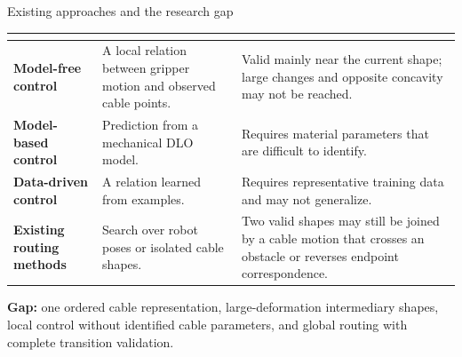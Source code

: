 \documentclass[aspectratio=169,10pt]{beamer}
\begin{document}
\begin{frame}[t]{Existing approaches and the research gap}
  \small
  \renewcommand{\arraystretch}{1.28}
  \setlength{\tabcolsep}{5pt}
  \begin{tabularx}{\textwidth}{>{\bfseries}p{2.35cm}YY}
    \toprule
     &  &
      \\
    \midrule
    Model-free control &
      A local relation between gripper motion and observed cable points. &
      Valid mainly near the current shape; large changes and opposite
      concavity may not be reached.\\
    Model-based control &
      Prediction from a mechanical DLO model. &
      Requires material parameters that are difficult to identify.\\
    Data-driven control &
      A relation learned from examples. &
      Requires representative training data and may not generalize.\\
    Existing routing methods &
      Search over robot poses or isolated cable shapes. &
      Two valid shapes may still be joined by a cable motion that crosses an
      obstacle or reverses endpoint correspondence.\\
    \bottomrule
  \end{tabularx}

  \vspace{0.24cm}
  \textbf{Gap:} one ordered cable
  representation, large-deformation intermediary shapes, local control
  without identified cable parameters, and global routing with complete
  transition validation.

\end{frame}
\end{document}
